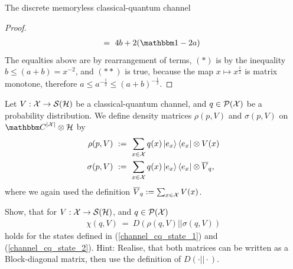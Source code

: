 \begin{section}{The discrete memoryless  classical-quantum channel}
\begin{proof}
\begin{align*}
         & \ = 	\	 4b + 2(\bbmeins - 2 a)
         \end{align*}
		 The equalties above are by rearrangement of terms, $(*)$ is by the inequality $b \leq (a+b) = x^{-2}$, and $(**)$ is true, because the map $x \mapsto x^{\frac{1}{2}}$ is matrix monotone, therefore $a \leq a^{-\frac{1}{2}} \leq (a+b)^{-\frac{1}{2}}$.
       \end{proof}
     Let $V: {\mathcal X} \rightarrow {\mathcal S}({\mathcal H})$ be a classical-quantum channel, and $q \in {\mathcal P}({\mathcal X})$ be a probability distribution. We define density matrices $\rho(p,V)$ and $\sigma(p,V)$ on $\bbmC^{|\cX|} \otimes \cH$ by
      \begin{align}
       \rho(p,V) \ &:= \ \sum_{x \in {\mathcal X}} q(x) \ket{e_x} \bra{e_x} \otimes V(x) \label{channel_cq_state_1}\\
       \sigma(p,V) \ &:= \ \sum_{x \in {\mathcal X}} q(x) \ket{e_x} \bra{e_x} \otimes \overline{V}_q,      
       \label{channel_cq_state_2}
      \end{align}
      where we again used the definition $\overline{V}_q := \sum_{x \in {\mathcal X}} V(x)$.
      \begin{exercise} \label{ex:cq_states_holevo_chi}
       Show, that for $V: {\mathcal X} \rightarrow {\mathcal S}({\mathcal H})$, and $q \in {\mathcal P}({\mathcal X})$
       \begin{align*}
       \chi(q,V) \ = \ D(\rho(q,V)||\sigma(q,V))
       \end{align*}
       holds for the states defined in (\ref{channel_cq_state_1}) and (\ref{channel_cq_state_2}). Hint: Realise, that both matrices can be written as a Block-diagonal matrix, then use the definition of $D(\cdot||\cdot)$. 
      \end{exercise}


\end{section}
